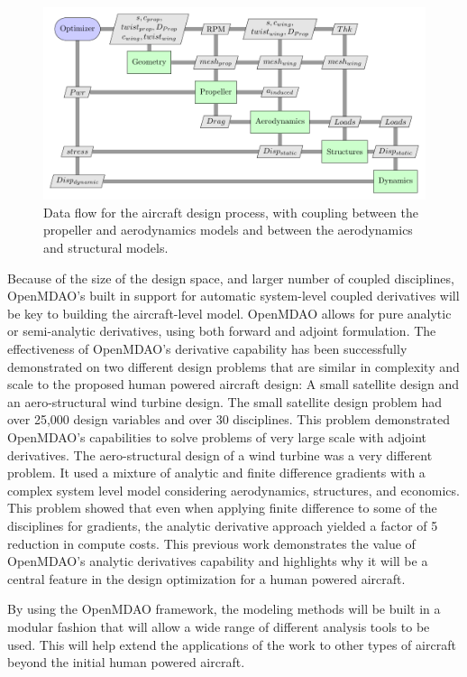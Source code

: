 \documentclass[]{aiaa-tc}
\begin{document}
    \begin{figure} \centering
        \includegraphics[width=.75\textwidth]{xdsm/overall}
        \caption{Data flow for the aircraft design process, with coupling between the propeller and aerodynamics models 
        and between the aerodynamics and structural models. }
        \label{fig:n2}
    \end{figure}

    Because of the size of the design space, and larger number of coupled disciplines, OpenMDAO's built in support for 
    automatic system-level coupled derivatives will be key to building the aircraft-level model. OpenMDAO allows for 
    pure analytic or semi-analytic derivatives, using both forward and adjoint formulation. The effectiveness of OpenMDAO's 
    derivative capability has been successfully demonstrated on two different design problems that are similar in complexity 
    and scale to the proposed human powered aircraft design: A small satellite design and an aero-structural 
    wind turbine design\cite{gray2014derivatives}. The small satellite design problem had over 25,000 design variables 
    and over 30 disciplines. This problem demonstrated OpenMDAO's capabilities to solve problems of very large scale with adjoint 
    derivatives. The aero-structural design of a wind turbine was a very different problem. It used a mixture of analytic and 
    finite difference gradients with a complex system level model considering aerodynamics, structures, and economics. 
    This problem showed that even when applying finite difference to some of the disciplines for gradients, the analytic 
    derivative approach yielded a factor of 5 reduction in compute costs. This previous work demonstrates the 
    value of OpenMDAO's analytic derivatives capability and highlights why it will be a central feature in the design 
    optimization for a human powered aircraft. 

    By using the OpenMDAO framework, the modeling methods will be built in a modular fashion that will allow a wide range of
    different analysis tools to be used. This will help extend the applications of the work to other types of aircraft beyond the 
    initial human powered aircraft. 
\end{document}
